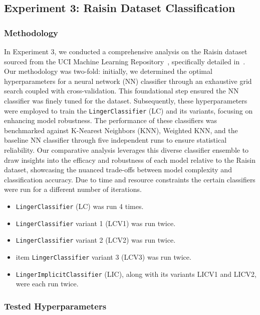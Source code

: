 \documentclass[a4paper, 12pt]{report}
\begin{document}
\subsection{Experiment 3: Raisin Dataset Classification}
\subsubsection{Methodology}
In Experiment 3, we conducted a comprehensive analysis on the Raisin dataset sourced from the UCI Machine Learning Repository~\cite{uciDatasets}, 
specifically detailed in~\cite{misc_raisin_850}. Our methodology was two-fold: initially, we determined the optimal hyperparameters for a neural network (NN) classifier 
through an exhaustive grid search coupled with cross-validation. This foundational step ensured the NN classifier was finely tuned for the dataset. 
Subsequently, these hyperparameters were employed to train the \texttt{LingerClassifier} (LC) and its variants, focusing on enhancing model robustness. 
The performance of these classifiers was benchmarked against K-Nearest Neighbors (KNN), Weighted KNN, and the baseline NN classifier through five independent
 runs to ensure statistical reliability. Our comparative analysis leverages this diverse classifier ensemble to draw insights into the efficacy and robustness of 
 each model relative to the Raisin dataset, showcasing the nuanced trade-offs between model complexity and classification accuracy.
 Due to time and resource constraints the certain classifiers were run for a different number of iterations.
\begin{itemize}
    \item \texttt{LingerClassifier} (LC) was run 4 times.
    \item \texttt{LingerClassifier} variant 1 (LCV1) was run twice.
    \item \texttt{LingerClassifier} variant 2 (LCV2) was run twice.
    \item item \texttt{LingerClassifier} variant 3 (LCV3) was run twice.
    \item \texttt{LingerImplicitClassifier} (LIC), along with its variants LICV1 and LICV2, were each run twice.
\end{itemize}

\subsubsection{Tested Hyperparameters}
\end{document}
